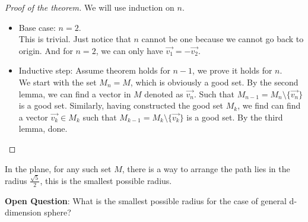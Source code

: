 \documentclass{article}
\newenvironment{theorem*}
 {\expandafter\def\expandafter\thetheorem\expandafter{\thetheorem*}\theorem}
 {\endtheorem}
\begin{document}
\begin{proof}[Proof of the theorem]
    We will use induction on $n$.
    \begin{itemize}
        \item Base case: $n=2$.\\ 
        This is trivial. Just notice that $n$ cannot be one because we cannot go back to origin. And for $n=2$, we can only have $\vec{v_1}=-\vec{v_2}$.
        \item Inductive step: Assume theorem holds for $n-1$, we prove it holds for $n$.\\
        We start with the set $M_n=M$, which is obviously a good set. By the second lemma, we can find a vector in $M$ denoted as $\vec{v_n}$. Such that $M_{n-1}=M_n\setminus\{\vec{v_n}\}$ is a good set. 
        Similarly, having constructed the good set $M_k$, we find can find a vector $\vec{v_k}\in M_k$ such that $M_{k-1}=M_k\setminus\{\vec{v_k}\}$ is a good set. By the third lemma, done.
    \end{itemize}
\end{proof}


\begin{theorem*}
    In the plane, for any such set $M$, there is a way to arrange the path lies in the radius $\frac{\sqrt{5}}{2}$, this is the smallest possible radius.
\end{theorem*}

\textbf{Open Question}: What is the smallest possible radius for the case of general d-dimension sphere?
\end{document}
